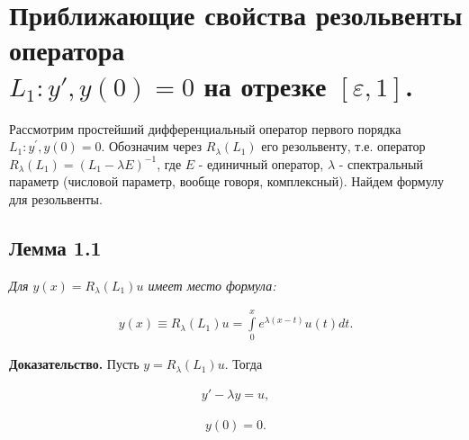  


\renewcommand{\rmdefault}{cmr} %
\renewcommand{\sfdefault}{cmss} %
\renewcommand{\ttdefault}{cmtt} %



%

\tableofcontents

\abbrevdef
\intro
\chapter{Приближающие свойства резольвенты оператора \\ $ L_1:y', y(0)=0 $ на отрезке $ [\varepsilon, 1] $.}
Рассмотрим простейший дифференциальный оператор первого порядка $ L_1:y^{'}, y(0)=0 $. Обозначим через $ R_\lambda(L_1) $ его резольвенту, т.е. оператор $ R_\lambda(L_1)=(L_1-\lambda E)^{-1} $, где $ E $ - единичный оператор, $ \lambda $ - спектральный параметр (числовой параметр,  вообще говоря, комплексный). Найдем формулу для резольвенты.

\section{Лемма 1.1}
\label{lemma1.1}

\textit{Для $ y(x) = R_\lambda(L_1)u$ имеет место формула:}

\begin{equation}
\begin{array}{c}

y(x) \equiv R_\lambda(L_1)u = \int\limits_0^x e^{\lambda(x-t)}u(t)dt.

\end{array}
\end{equation}

\textbf{Доказательство.} Пусть $ y = R_\lambda(L_1)u$. Тогда

\begin{equation}
\begin{array}{c}

y'- \lambda y = u,

\end{array}
\end{equation}

\begin{equation}
\begin{array}{c}

y(0)=0.

\end{array}
\end{equation}

